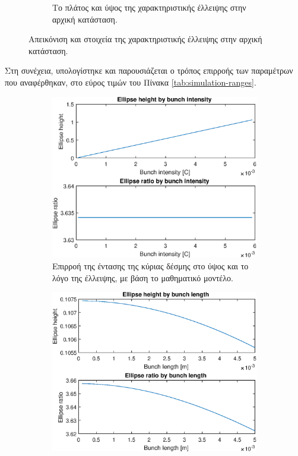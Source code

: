 \begin{figure}[tph]
\begin{subfigure}{0.47\textwidth}
		\centering
		\caption{Το πλάτος και ύψος της χαρακτηριστικής έλλειψης στην αρχική κατάσταση.}
		\label{fig:MATLAB-variable-analysis-initial-ellipse-height-width}
	\end{subfigure}
\caption{Απεικόνιση και στοιχεία της χαρακτηριστικής έλλειψης στην αρχική κατάσταση.}
\label{fig:MATLAB-initial-ellipse}
\end{figure}

Στη συνέχεια, υπολογίστηκε και παρουσιάζεται ο τρόπος επιρροής των παραμέτρων που αναφέρθηκαν, στο εύρος τιμών του Πίνακα \ref{tab:simulation-ranges}.


\begin{figure}[tph]	
	\centering
	\begin{subfigure}{0.47\textwidth}
		\includegraphics[width=\linewidth]{figures/MATLAB-variable-analysis/EBS-variables-intensity}
		\centering
		\caption{Επιρροή της έντασης της κύριας δέσμης στο ύψος και το λόγο της έλλειψης, με βάση το μαθηματικό μοντέλο.}
		\label{fig:EBS-variables-intensity}
	\end{subfigure}
	\hfill
	\begin{subfigure}{0.47\textwidth}
		\includegraphics[width=\linewidth]{figures/MATLAB-variable-analysis/EBS-variables-length}

\end{subfigure}
\end{figure}
